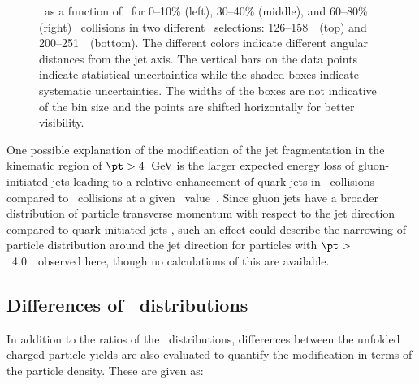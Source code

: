 \begin{figure}[h]
{\begin{tabular}{ccc}
\end{tabular} 
}
   \caption{\RDptr\ as a function of \pt\ for  0--10\% (left), 30--40\% (middle), and 60--80\% (right) \PbPb\ collisions in two different \ptjet\ selections: 126--158~\GeV\ (top) and 200--251~\GeV\ (bottom). The different colors indicate different angular distances from the jet axis. The vertical bars on the data points indicate statistical uncertainties while the shaded boxes indicate systematic uncertainties. The widths of the boxes are not indicative of the bin size and the points are shifted horizontally for better visibility.}
      \label{fig:pttrkdep}
\end{figure}


One possible explanation of the modification of the 
jet fragmentation in the kinematic region of \mbox{$\pt > 4$ GeV} is the larger expected energy loss
of gluon-initiated jets leading to a relative enhancement of quark jets in \pbpb\ collisions compared
to \pp\ collisions at a given \ptjet\ value~\cite{Aaboud:2018hpb, Spousta:2015fca}. Since gluon jets have a broader distribution of particle transverse momentum with respect to the jet direction compared to quark-initiated jets \cite{OPAL:1995ab}, 
such an effect could describe the narrowing of particle distribution around the jet direction for particles with $\pt >$~4.0~\GeV\
observed here, though no calculations of this are available.





\subsection{Differences of \Dptr\ distributions}
\label{sec:discussion_delta_dptr}
In addition to the ratios of the \Dptr\ distributions, differences between the unfolded charged-particle yields are also evaluated to quantify the modification in terms of the particle density. These are given as:

